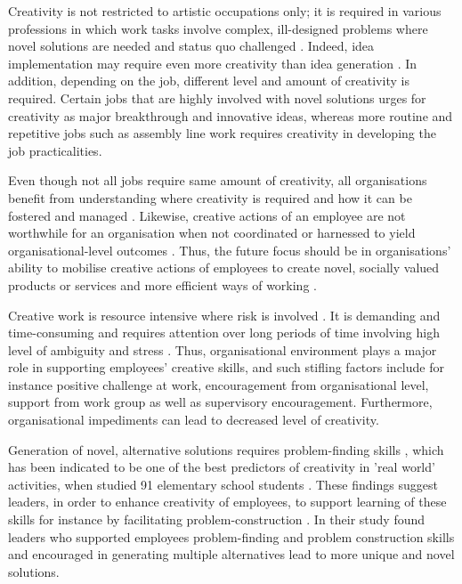 Creativity is not restricted to artistic occupations only; it is required in various professions in which work tasks involve complex, ill-designed problems where novel solutions are needed and status quo challenged \citep{mumford1988creativity}. Indeed, idea implementation may require even more creativity than idea generation \citep{mumford2002leading}. In addition, depending on the job, different level and amount of creativity is required. Certain jobs that are highly involved with novel solutions urges for creativity as major breakthrough and innovative ideas, whereas more routine and repetitive jobs such as assembly line work requires creativity in developing the job practicalities. \citep{shalley2004leaders} 

Even though not all jobs require same amount of creativity, all organisations benefit from understanding where creativity is required and how it can be fostered and managed \citep{shalley2004leaders}. Likewise, creative actions of an employee are not worthwhile for an organisation when not coordinated or harnessed to yield organisational-level outcomes \citep{jung2003role}. Thus, the future focus should be in organisations' ability to mobilise creative actions of employees to create novel, socially valued products or services and more efficient ways of working \citep{mumford1988creativity}. 

Creative work is resource intensive where risk is involved \citep{mumford2002leading}. It is demanding and time-consuming \citep{mumford2002leading} and requires attention over long periods of time involving high level of ambiguity and stress \citep{kasof1997creativity}. Thus, organisational environment plays a major role in supporting employees' creative skills, and such stifling factors include for instance positive challenge at work, encouragement from organisational level, support from work group as well as supervisory encouragement. Furthermore, organisational impediments can lead to decreased level of creativity. \citep{amabile1998kill} 

Generation of novel, alternative solutions requires problem-finding skills \citep{runco1988problem}, which has been indicated to be one of the best predictors of creativity in 'real world' activities, when studied 91 elementary school students \citep{runco1990evaluating}. These findings suggest leaders, in order to enhance creativity of employees, to support learning of these skills for instance by facilitating problem-construction \citep{redmond1993putting}. In their study \citet{redmond1993putting} found leaders who supported employees problem-finding and problem construction skills and encouraged in generating multiple alternatives lead to more unique and novel solutions. 

